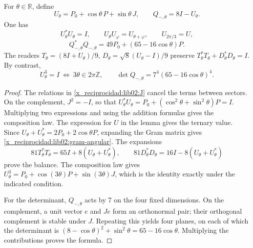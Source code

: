 \begin{theorem}
\label{x_reciprocidad:lib02:Utheta}
For \(\theta\in\mathbb R\), define
\[
 U_\theta=P_0+\cos\theta\,P+\sin\theta\,J,\qquad
 Q_{-,\theta}=8I-U_\theta.
\]
One has
\[
 U_\theta^*U_\theta=I,\qquad
 U_\theta U_\varphi=U_{\theta+\varphi},\qquad U_{2\pi/3}=U,
\]
\begin{equation}
 Q_{-,\theta}^*Q_{-,\theta}
 =49P_0+(65-16\cos\theta)P.
 \label{x_reciprocidad:lib02:gram-angular}
\end{equation}
The readers \(T_\theta=(8I+U_\theta)/9\), \(D_\theta=\sqrt8(U_\theta-I)/9\) preserve \(T_\theta^*T_\theta+D_\theta^*D_\theta=I\). By contrast,
\[
 U_\theta^3=I\ \Longleftrightarrow\ 3\theta\in2\pi\mathbb Z,
 \qquad
 \det Q_{-,\theta}=7^4(65-16\cos\theta)^4.
\]
\end{theorem}
\begin{proof}
The relations in \cref{x_reciprocidad:lib02:J} cancel the terms between sectors. On the complement, \(J^2=-I\), so that \(U_\theta^*U_\theta=P_0+(\cos^2\theta+\sin^2\theta)P=I\). Multiplying two expressions and using the addition formulas gives the composition law. The expression for \(U\) in the lemma gives the ternary value. Since \(U_\theta+U_\theta^*=2P_0+2\cos\theta P\), expanding the Gram matrix gives \eqref{x_reciprocidad:lib02:gram-angular}. The expansions
\[
 81T_\theta^*T_\theta=65I+8(U_\theta+U_\theta^*),\qquad
 81D_\theta^*D_\theta=16I-8(U_\theta+U_\theta^*)
\]
prove the balance. The composition law gives \(U_\theta^3=P_0+\cos(3\theta)P+\sin(3\theta)J\), which is the identity exactly under the indicated condition.

For the determinant, \(Q_{-,\theta}\) acts by 7 on the four fixed dimensions. On the complement, a unit vector \(e\) and \(Je\) form an orthonormal pair; their orthogonal complement is stable under \(J\). Repeating this yields four planes, on each of which the determinant is \((8-\cos\theta)^2+\sin^2\theta=65-16\cos\theta\). Multiplying the contributions proves the formula.
\end{proof}

